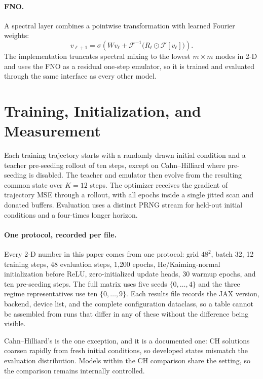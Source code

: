 \paragraph{FNO.}
A spectral layer combines a pointwise transformation with learned Fourier weights:
\begin{equation}
 v_{\ell+1}=\sigma\!\left(Wv_\ell+
 \mathcal{F}^{-1}\bigl(R_\ell\odot\mathcal{F}[v_\ell]\bigr)\right).
\end{equation}
The implementation truncates spectral mixing to the lowest $m\times m$ modes in 2-D and
uses the FNO as a residual one-step emulator, so it is trained and evaluated through the
same interface as every other model.




\clearpage

\section{Training, Initialization, and Measurement}
\label{sec:metrics}
\label{sec:setup}
Each training trajectory starts with a randomly drawn initial condition and a teacher
pre-seeding rollout of ten steps, except on Cahn--Hilliard where pre-seeding is disabled.
The teacher and emulator then evolve from the resulting common state over $K=12$ steps.
The optimizer receives the gradient of trajectory MSE through a  rollout,
with all epochs inside a single jitted scan and donated buffers. Evaluation uses a
distinct PRNG stream for held-out initial conditions and a four-times longer horizon.

\paragraph{One protocol, recorded per file.}
Every 2-D number in this paper
comes from one protocol: grid $48^2$, batch 32, 12 training steps, 48 evaluation steps,
1{,}200 epochs, He/Kaiming-normal initialization before ReLU, zero-initialized update
heads, 30 warmup epochs, and ten pre-seeding steps. The full matrix uses five seeds
$\{0,\dots,4\}$ and the three regime representatives use ten $\{0,\dots,9\}$. Each
results file records the JAX version, backend, device list, and the complete
configuration dataclass, so a table cannot be assembled from runs that differ in any of
these without the difference being visible.

Cahn--Hilliard's  is the one exception, and it is a documented
one: CH solutions coarsen rapidly from fresh initial conditions, so developed states
mismatch the evaluation distribution. Models within the CH comparison share the setting,
so the comparison remains internally controlled.

